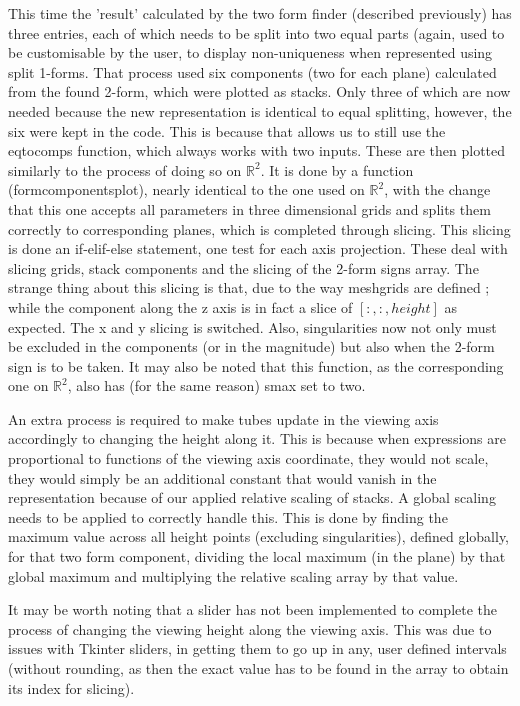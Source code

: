 \documentclass[12pt]{report}
\begin{document}
This time the 'result' calculated by the two form finder (described previously) has three entries, each of which needs to be split into two equal parts (again, used to be customisable by the user, to display non-uniqueness when represented using split 1-forms. That process used six components (two for each plane) calculated from the found 2-form, which were plotted as stacks. Only three of which are now needed because the new representation is identical to equal splitting, however, the six were kept in the code. This is because that allows us to still use the eq\textunderscore to\textunderscore comps function, which always works with two inputs. These are then plotted similarly to the process of doing so on $\mathbb{R}^{2}$. It is done by a function (form\textunderscore components\textunderscore plot), nearly identical to the one used on $\mathbb{R}^{2}$, with the change that this one accepts all parameters in three dimensional grids and splits them correctly to corresponding planes, which is completed through slicing.
This slicing is done an if-elif-else statement, one test for each axis projection. These deal with slicing grids, stack components and the slicing of the 2-form signs array.
The strange thing about this slicing is that, due to the way meshgrids are defined ; while the component along the z axis is in fact a slice of $[:, :, height]$ as expected. The x and y slicing is switched.
Also, singularities now not only must be excluded in the components (or in the magnitude) but also when the 2-form sign is to be taken.
It may also be noted that this function, as the corresponding one on $\mathbb{R}^{2}$, also has (for the same reason) s\textunderscore max set to two.

\noindent An extra process is required to make tubes update in the viewing axis accordingly to changing the height along it. This is because when expressions are proportional to functions of the viewing axis coordinate, they would not scale, they would simply be an additional constant that would vanish in the representation because of our applied relative scaling of stacks. A global scaling needs to be applied to correctly handle this.
This is done by finding the maximum value across all height points (excluding singularities), defined globally, for that two form component, dividing the local maximum (in the plane) by that global maximum and multiplying the relative scaling array by that value.

It may be worth noting that a slider has not been implemented to complete the process of changing the viewing height along the viewing axis. This was  due to issues with Tkinter sliders, in getting them to go up in any, user defined intervals (without rounding, as then the exact value has to be found in the array to obtain its index for slicing).
\end{document}
